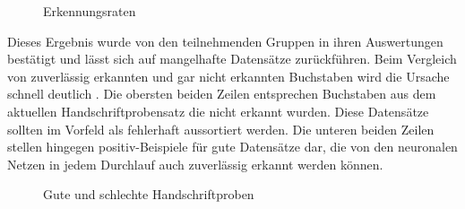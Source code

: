 \begin{figure}[h!]
	\begin{center}
	\caption{Erkennungsraten}
	\label{histogram}
	\end{center}
\end{figure}

Dieses Ergebnis wurde von den teilnehmenden Gruppen in ihren Auswertungen bestätigt und lässt sich auf mangelhafte Datensätze zurückführen. Beim Vergleich von zuverlässig erkannten und gar nicht erkannten Buchstaben wird die Ursache schnell deutlich . Die obersten beiden Zeilen entsprechen Buchstaben aus dem aktuellen Handschriftprobensatz die nicht erkannt wurden. Diese Datensätze sollten im Vorfeld als fehlerhaft aussortiert werden. Die unteren beiden Zeilen stellen hingegen positiv-Beispiele für gute Datensätze dar, die von den neuronalen Netzen in jedem Durchlauf auch zuverlässig erkannt werden können.

\begin{figure}[h!]
	\begin{center}
	\caption{Gute und schlechte Handschriftproben}
	\label{chars}
	\end{center}
\end{figure}



